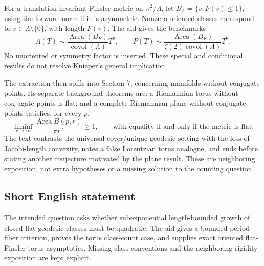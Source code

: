 \documentclass[11pt]{article}
\newcommand{\R}{\mathbb{R}}
\begin{document}
For a translation-invariant Finsler metric on \(\R^2/\Lambda\), let \(B_F=\{v:F(v)\leq1\}\), using the forward norm if it is asymmetric. Nonzero oriented classes correspond to \(v\in\Lambda\setminus\{0\}\), with length \(F(v)\). The aid gives the benchmarks
\[
 A(T)\sim\frac{\operatorname{Area}(B_F)}{\operatorname{covol}(\Lambda)}T^2,
 \qquad
 P(T)\sim\frac{\operatorname{Area}(B_F)}{\zeta(2)\operatorname{covol}(\Lambda)}T^2.
\]
No unoriented or symmetry factor is inserted. These special and conditional results do not resolve Knieper's general implication.

The extraction then spills into Section \(7\), concerning manifolds without conjugate points. Its separate background theorems are: a Riemannian torus without conjugate points is flat; and a complete Riemannian plane without conjugate points satisfies, for every \(p\),
\[
 \liminf_{r\to\infty}\frac{\operatorname{Area}B(p,r)}{\pi r^2}\geq1,
 \qquad\text{with equality if and only if the metric is flat.}
\]
The text contrasts the universal-cover/unique-geodesic setting with the loss of Jacobi-length convexity, notes a false Lorentzian torus analogue, and ends before stating another conjecture motivated by the plane result. These are neighboring exposition, not extra hypotheses or a missing solution to the counting question.
\subsection{Short English statement}
The intended question asks whether subexponential length-bounded growth of closed flat-geodesic classes must be quadratic. The aid gives a bounded-period-fiber criterion, proves the torus class-count case, and supplies exact oriented flat-Finsler-torus asymptotics. Missing class conventions and the neighboring rigidity exposition are kept explicit.
\end{document}
